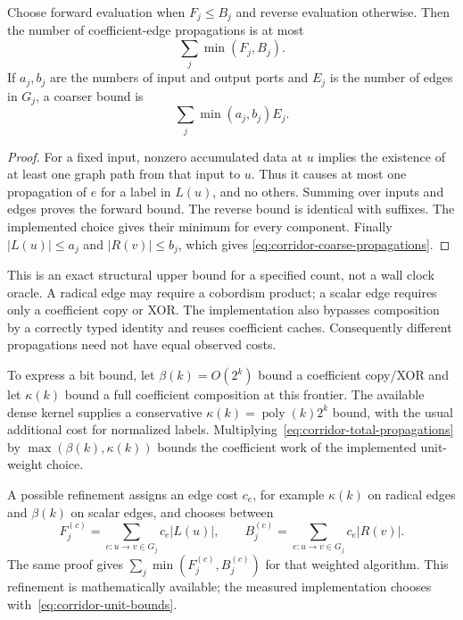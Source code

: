 \begin{theorem}\label{thm:corridor-work}
Choose forward evaluation when $F_j\le B_j$ and reverse evaluation otherwise.
Then the number of coefficient-edge propagations is at most
\begin{equation}\label{eq:corridor-total-propagations}
  \sum_j\min(F_j,B_j).
\end{equation}
If $a_j,b_j$ are the numbers of input and output ports and $E_j$ is the
number of edges in $G_j$, a coarser bound is
\begin{equation}\label{eq:corridor-coarse-propagations}
 \sum_j\min(a_j,b_j)E_j.
\end{equation}
\end{theorem}
\begin{proof}
For a fixed input, nonzero accumulated data at $u$ implies the existence of
at least one graph path from that input to $u$.  Thus it causes at most one
propagation of $e$ for a label in $L(u)$, and no others.  Summing over inputs
and edges proves the forward bound.  The reverse bound is identical with
suffixes.  The implemented choice gives their minimum for every component.
Finally $|L(u)|\le a_j$ and $|R(v)|\le b_j$, which gives
\eqref{eq:corridor-coarse-propagations}.
\end{proof}

This is an exact structural upper bound for a specified count, not a wall
clock oracle.  A radical edge may require a cobordism product; a scalar edge
requires only a coefficient copy or XOR.  The implementation also bypasses
composition by a correctly typed identity and reuses coefficient caches.
Consequently different propagations need not have equal observed costs.

To express a bit bound, let $\beta(k)=O(2^k)$ bound a coefficient copy/XOR
and let $\kappa(k)$ bound a full coefficient composition at this frontier.
The available dense kernel supplies a conservative
$\kappa(k)=\operatorname{poly}(k)2^k$ bound, with the usual additional cost
for normalized labels.  Multiplying~\eqref{eq:corridor-total-propagations}
by $\max(\beta(k),\kappa(k))$ bounds the coefficient work of the implemented
unit-weight choice.

A possible refinement assigns an edge cost $c_e$, for example
$\kappa(k)$ on radical edges and $\beta(k)$ on scalar edges, and chooses
between
\[
 F_j^{(c)}=\sum_{e:u\to v\in G_j}c_e|L(u)|,
 \qquad
 B_j^{(c)}=\sum_{e:u\to v\in G_j}c_e|R(v)|.
\]
The same proof gives $\sum_j\min(F_j^{(c)},B_j^{(c)})$ for that weighted
algorithm.  This refinement is mathematically available; the measured
implementation chooses with~\eqref{eq:corridor-unit-bounds}.

